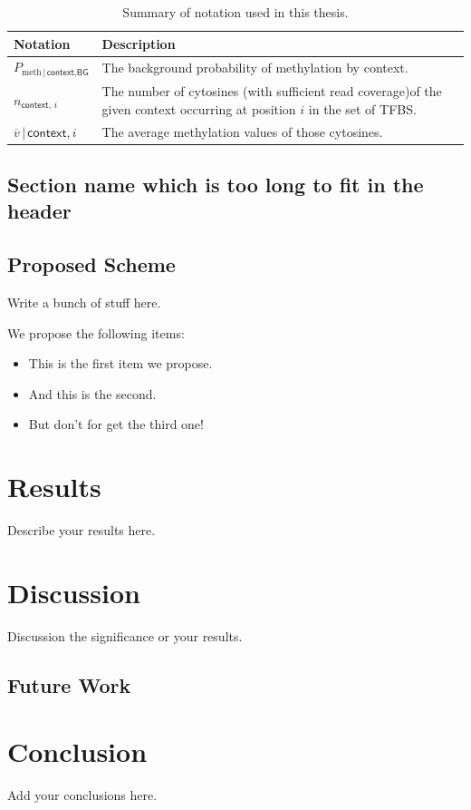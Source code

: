 \documentclass[BibLaTeXsortingNone]{PHlab-thesis}
\begin{document}
\begin{table}
\begin{tabularx}{0.9\linewidth}{lX}
Notation                                               &  Description\\
\toprule
$P_{\text{meth}\,|\,\textsf{context,BG}}$                    &  The background probability of methylation by context.\\[.3ex]
$n_{\textsf{context},\,i}$                                 &  The number of cytosines (with sufficient read coverage)\newline of the given context occurring at position $i$ in the set of TFBS.\\[.3ex]
$\overline{v}\,|\,\scriptstyle{\textsf{context},i}$  & The average methylation values of those cytosines.\\
\bottomrule
\end{tabularx}
\caption{Summary of notation used in this thesis.}
\label{tab:notation}
\end{table}


\section[Shorter Section Name]{Section name which is too long to fit in the header}


\section{Proposed Scheme}
Write a bunch of stuff here.

We propose the following items:
%
\begin{itemize}
\item This is the first item we propose.
\item And this is the second.
\item But don't for get the third one!
\end{itemize}


\chapter{Results}
Describe your results here.


\chapter{Discussion}
Discussion the significance or your results.


\section{Future Work}


\chapter{Conclusion}
Add your conclusions here.


\newpage
{}
\printbibliography
\end{document}
